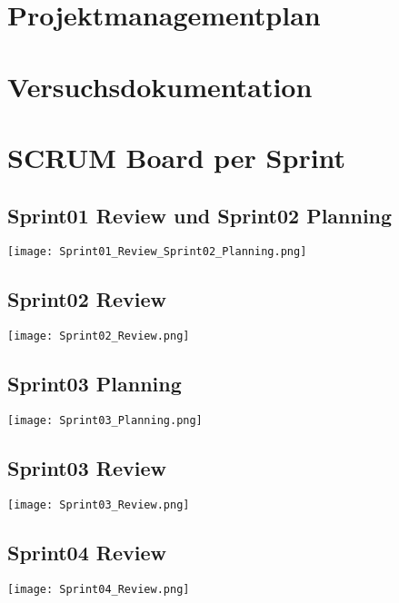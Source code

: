 \chapter{Projektmanagementplan}


\chapter{Versuchsdokumentation}
\label{app:ch:versuche}



\chapter{SCRUM Board per Sprint}

\begin{landscape}
	\section*{Sprint01 Review und Sprint02 Planning}
	\texttt{[image: Sprint01\_Review\_Sprint02\_Planning.png]}
\end{landscape}

\newpage
\section*{Sprint02 Review}
\texttt{[image: Sprint02\_Review.png]}

\newpage
\begin{landscape}
	\section*{Sprint03 Planning}
	\texttt{[image: Sprint03\_Planning.png]}
\end{landscape}

\newpage
\section*{Sprint03 Review}
\texttt{[image: Sprint03\_Review.png]}

\newpage
\begin{landscape}
	\section*{Sprint04 Review}
	\texttt{[image: Sprint04\_Review.png]}
\end{landscape}

